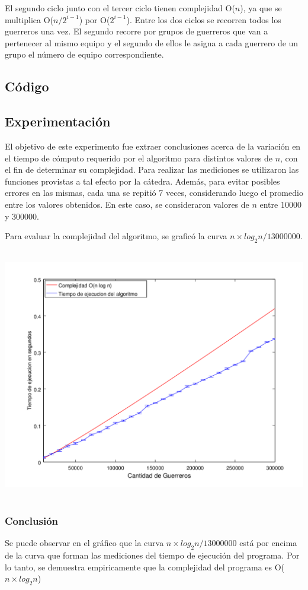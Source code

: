 El segundo ciclo junto con el tercer ciclo tienen complejidad O($n$), ya que se multiplica O($n/2^{i-1}$) por O($2^{i-1}$). Entre los dos ciclos se recorren todos los guerreros una vez. El segundo recorre por grupos de guerreros que van a pertenecer al mismo equipo y el segundo de ellos le asigna a cada guerrero de un grupo el número de equipo correspondiente. 


    \subsection{Código}


    \subsection{Experimentación}
		El objetivo de este experimento fue extraer conclusiones acerca de la variación en el tiempo de cómputo requerido por el algoritmo para distintos valores de $n$, con el fin de determinar su complejidad. 
		Para realizar las mediciones se  utilizaron las funciones provistas a tal efecto por la cátedra. Además, para evitar posibles errores en las mismas, cada una se repitió 7 veces, considerando luego el promedio entre los valores obtenidos. En este caso, se consideraron valores de $n$ entre 10000 y 300000.

    Para evaluar la complejidad del algoritmo, se graficó la curva $n \times log_{2}n / 13000000$.

      \includegraphics[height=11cm]{graficos/kaioken-exp.png}



		\subsubsection*{Conclusión}
			Se puede observar en el gráfico que la curva $n \times log_{2}n / 13000000$ está por encima de la curva que forman las mediciones del tiempo de ejecución del programa. Por lo tanto, se demuestra empiricamente que la complejidad del programa es O($n \times log_{2}n$)
